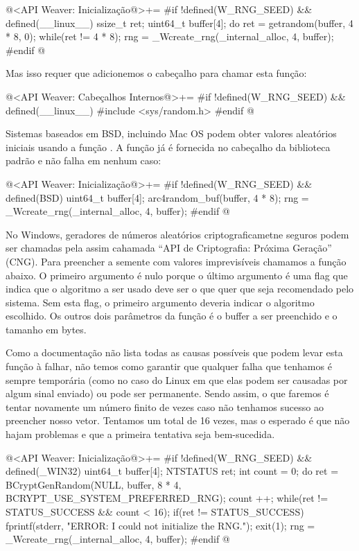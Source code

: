 \iniciocodigo
@<API Weaver: Inicialização@>+=
#if !defined(W_RNG_SEED) && defined(__linux__)
{
  ssize_t ret;
  uint64_t buffer[4];
  do{
    ret = getrandom(buffer, 4 * 8, 0);
  }while(ret != 4 * 8);
  rng = _Wcreate_rng(_internal_alloc, 4, buffer);
}
#endif
@
\fimcodigo

Mas isso requer que adicionemos o cabeçalho para chamar esta função:

\iniciocodigo
@<API Weaver: Cabeçalhos Internos@>+=
#if !defined(W_RNG_SEED) && defined(__linux__)
#include <sys/random.h>
#endif
@
\fimcodigo

Sistemas baseados em BSD, incluindo Mac OS podem obter valores
aleatórios iniciais usando a função . A
função já é fornecida no cabeçalho da biblioteca padrão e não falha em
nenhum caso:

\iniciocodigo
@<API Weaver: Inicialização@>+=
#if !defined(W_RNG_SEED) && defined(BSD)
{
  uint64_t buffer[4];
  arc4random_buf(buffer, 4 * 8);
  rng = _Wcreate_rng(_internal_alloc, 4, buffer);
}
#endif
@
\fimcodigo

No Windows, geradores de números aleatórios criptograficametne seguros
podem ser chamadas pela assim cahamada ``API de Criptografia: Próxima
Geração'' (CNG). Para preencher a semente com valores imprevisíveis
chamamos a função abaixo. O primeiro argumento é nulo porque o último
argumento é uma flag que indica que o algoritmo a ser usado deve ser o
que quer que seja recomendado pelo sistema. Sem esta flag, o primeiro
argumento deveria indicar o algoritmo escolhido. Os outros dois
parâmetros da função é o buffer a ser preenchido e o tamanho em bytes.

Como a documentação não lista todas as causas possíveis que podem
levar esta função à falhar, não temos como garantir que qualquer falha
que tenhamos é sempre temporária (como no caso do Linux em que elas
podem ser causadas por algum sinal enviado) ou pode ser
permanente. Sendo assim, o que faremos é tentar novamente um número
finito de vezes caso não tenhamos sucesso ao preencher nosso
vetor. Tentamos um total de 16 vezes, mas o esperado é que não hajam
problemas e que a primeira tentativa seja bem-sucedida.

\iniciocodigo
@<API Weaver: Inicialização@>+=
#if !defined(W_RNG_SEED) && defined(_WIN32)
{
  uint64_t buffer[4];
  NTSTATUS ret;
  int count = 0;
  do{
    ret = BCryptGenRandom(NULL, buffer, 8 * 4,
                          BCRYPT_USE_SYSTEM_PREFERRED_RNG);
    count ++;
  } while(ret != STATUS_SUCCESS && count < 16);
  if(ret != STATUS_SUCCESS){
    fprintf(stderr, "ERROR: I could not initialize the RNG.\n");
    exit(1);
  }
  rng = _Wcreate_rng(_internal_alloc, 4, buffer);
}
#endif
@
\fimcodigo

